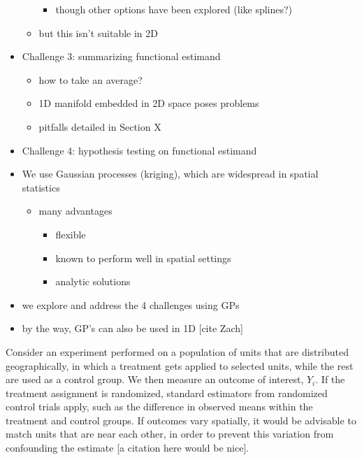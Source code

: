 \documentclass[letter]{article}
\providecommand{\tightlist}{%
      \setlength{\itemsep}{0pt}\setlength{\parskip}{0pt}}
\providecommand{\tightlist}{%
  	  \setlength{\itemsep}{0pt}\setlength{\parskip}{0pt}}
\begin{document}
\begin{itemize}
\begin{itemize}
    \begin{itemize}
    \tightlist
    \item
      though other options have been explored (like splines?)
    \end{itemize}
  \item
    but this isn't suitable in 2D
  \end{itemize}
\item
  Challenge 3: summarizing functional estimand

  \begin{itemize}
  \tightlist
  \item
    how to take an average?
  \item
    1D manifold embedded in 2D space poses problems
  \item
    pitfalls detailed in Section X
  \end{itemize}
\item
  Challenge 4: hypothesis testing on functional estimand
\item
  We use Gaussian processes (kriging), which are widespread in spatial
  statistics

  \begin{itemize}
  \tightlist
  \item
    many advantages

    \begin{itemize}
    \tightlist
    \item
      flexible
    \item
      known to perform well in spatial settings
    \item
      analytic solutions
    \end{itemize}
  \end{itemize}
\item
  we explore and address the 4 challenges using GPs
\item
  by the way, GP's can also be used in 1D {[}cite Zach{]}
\end{itemize}
    


    	Consider an experiment performed on a population of units that are
distributed geographically, in which a treatment gets applied to
selected units, while the rest are used as a control group. We then
measure an outcome of interest, \(Y_i\). If the treatment assignment is
randomized, standard estimators from randomized control trials apply,
such as the difference in observed means within the treatment and
control groups. If outcomes vary spatially, it would be advisable to
match units that are near each other, in order to prevent this variation
from confounding the estimate {[}a citation here would be nice{]}.
\end{document}
